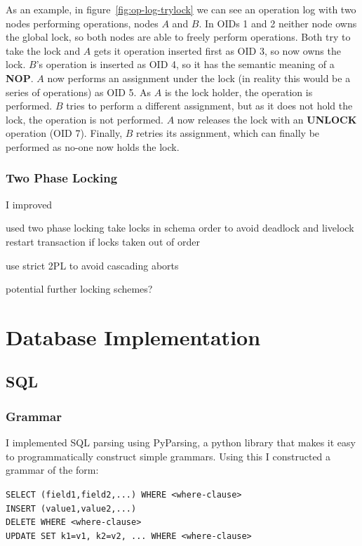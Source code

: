 \documentclass[12pt,twoside,notitlepage]{report}
\newcommand{\op}[1]  {{\bf #1}}         %
\begin{document}
As an example, in figure~\ref{fig:op-log-trylock} we can see an operation log with two nodes
performing operations, nodes $A$ and $B$. In OIDs 1 and 2 neither node owns the global lock, so both
nodes are able to freely perform operations. Both try to take the lock and $A$ gets it operation
inserted first as OID 3, so now owns the lock. $B$'s operation is inserted as OID 4, so it has the
semantic meaning of a \op{NOP}. $A$ now performs an assignment under the lock (in reality this
would be a series of operations) as OID 5. As $A$ is the lock holder, the operation is performed.
$B$ tries to perform a different assignment, but as it does not hold the lock, the operation is
not performed. $A$ now releases the lock with an \op{UNLOCK} operation (OID 7). Finally, $B$
retries its assignment, which can finally be performed as no-one now holds the lock.

\subsubsection{Two Phase Locking}

I improved

used two phase locking
take locks in schema order to avoid deadlock and livelock
restart transaction if locks taken out of order

use strict 2PL to avoid cascading aborts

potential further locking schemes?

\section{Database Implementation}

\subsection{SQL}


\subsubsection{Grammar}

I implemented SQL parsing using PyParsing, a python library that makes it easy to programmatically
construct simple grammars. Using this I constructed a grammar of the form:

\verb+SELECT (field1,field2,...) WHERE <where-clause>+ \\
\verb+INSERT (value1,value2,...)+ \\
\verb+DELETE WHERE <where-clause>+ \\
\verb+UPDATE SET k1=v1, k2=v2, ... WHERE <where-clause>+ \\
\end{document}
